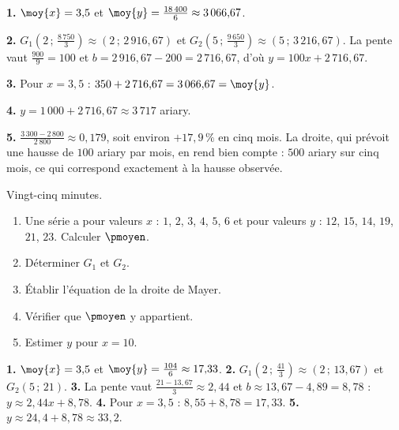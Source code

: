 \begin{corrige}
\textbf{1.} $\moy{x} = 3{,}5$ et
$\moy{y} = \frac{18\,400}{6} \approx 3\,066{,}67$.

\textbf{2.} $G_{1}\left(2\,;\,\frac{8\,750}{3}\right)
\approx (2\,;\,2\,916{,}67)$ et
$G_{2}\left(5\,;\,\frac{9\,650}{3}\right) \approx (5\,;\,3\,216{,}67)$. La
pente vaut $\frac{900}{9} = 100$ et
$b = 2\,916{,}67-200 = 2\,716{,}67$, d'où
$y = 100x+2\,716{,}67$.

\textbf{3.} Pour $x = 3{,}5$ : $350+2\,716{,}67 = 3\,066{,}67 = \moy{y}$.
\checkmark

\textbf{4.} $y = 1\,000+2\,716{,}67 \approx 3\,717$ ariary.

\textbf{5.} $\frac{3\,300-2\,800}{2\,800} \approx 0{,}179$, soit environ
$+17{,}9\,\%$ en cinq mois. La droite, qui prévoit une hausse de $100$
ariary par mois, en rend bien compte : $500$ ariary sur cinq mois, ce qui
correspond exactement à la hausse observée.
\end{corrige}

\begin{jemeteste}
Vingt-cinq minutes.

\begin{enumerate}[label=\textbf{\arabic*.}, leftmargin=*, itemsep=0.3em]
  \item Une série a pour valeurs $x$ : $1$, $2$, $3$, $4$, $5$, $6$ et pour
        valeurs $y$ : $12$, $15$, $14$, $19$, $21$, $23$. Calculer
        $\pmoyen$.
  \item Déterminer $G_{1}$ et $G_{2}$.
  \item Établir l'équation de la droite de Mayer.
  \item Vérifier que $\pmoyen$ y appartient.
  \item Estimer $y$ pour $x = 10$.
\end{enumerate}
\end{jemeteste}

\begin{corrige}[je me teste]
\textbf{1.} $\moy{x} = 3{,}5$ et $\moy{y} = \frac{104}{6}
\approx 17{,}33$.
\textbf{2.} $G_{1}\left(2\,;\,\frac{41}{3}\right) \approx (2\,;\,13{,}67)$
et $G_{2}\left(5\,;\,21\right)$.
\textbf{3.} La pente vaut $\frac{21-13{,}67}{3} \approx 2{,}44$ et
$b \approx 13{,}67-4{,}89 = 8{,}78$ : $y \approx 2{,}44x+8{,}78$.
\textbf{4.} Pour $x = 3{,}5$ : $8{,}55+8{,}78 = 17{,}33$. \checkmark
\textbf{5.} $y \approx 24{,}4+8{,}78 \approx 33{,}2$.
\end{corrige}

